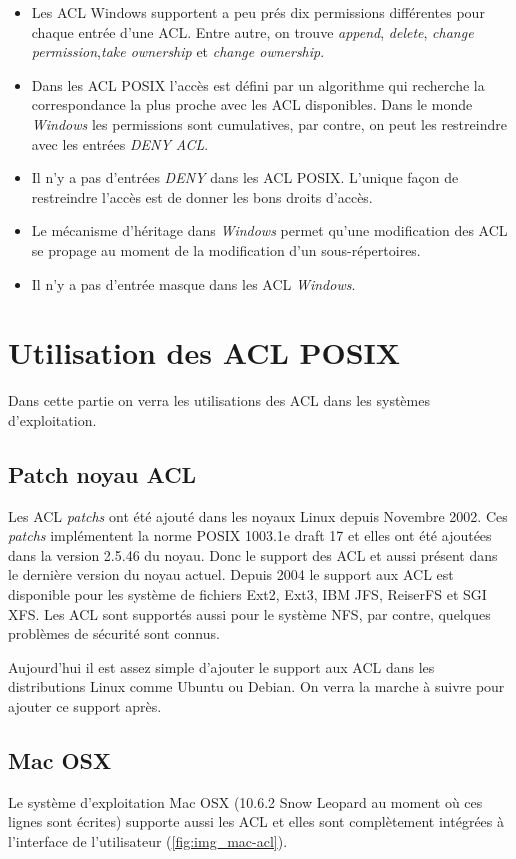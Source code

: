 \documentclass{article}
\begin{document}
\begin{itemize}
	\item Les ACL Windows supportent a peu prés dix permissions différentes pour chaque entrée d'une ACL. Entre autre, on trouve \emph{append}, \emph{delete}, \emph{change permission},\emph{take ownership} et \emph{change ownership}.
	\item Dans les ACL POSIX l'accès est défini par un algorithme qui recherche la correspondance la plus proche avec les ACL disponibles. Dans le monde \emph{Windows} les permissions sont cumulatives, par contre, on peut les restreindre avec les entrées \emph{DENY ACL}.
	\item Il n'y a pas d'entrées \emph{DENY} dans les ACL POSIX. L'unique façon de restreindre l'accès est de donner les bons droits d'accès.
	\item Le mécanisme d'héritage dans \emph{Windows} permet qu'une modification des ACL se propage au moment de la modification d'un sous-répertoires.
	\item Il n'y a pas d'entrée masque dans les ACL \emph{Windows}.
\end{itemize}

\section{Utilisation des ACL POSIX}

Dans cette partie on verra les utilisations des ACL dans les systèmes d'exploitation. 

\subsection{Patch noyau ACL}
Les ACL \emph{patchs} ont été ajouté dans les noyaux Linux depuis Novembre 2002. Ces \emph{patchs} implémentent la norme POSIX 1003.1e draft 17 et elles ont été ajoutées dans la version 2.5.46 du noyau. Donc le support des ACL et aussi présent dans le dernière version du noyau actuel. Depuis 2004 le support aux ACL est disponible pour les système de fichiers Ext2, Ext3, IBM JFS, ReiserFS et SGI XFS. Les ACL sont supportés aussi pour le système NFS, par contre, quelques problèmes de sécurité sont connus\cite{nfs_problem}. 

Aujourd'hui il est assez simple d'ajouter le support aux ACL dans les distributions Linux comme Ubuntu ou Debian. On verra la marche à suivre pour ajouter ce support après.

\subsection{Mac OSX}
Le système d'exploitation Mac OSX (10.6.2 Snow Leopard au moment où ces lignes sont écrites) supporte aussi les ACL et elles sont complètement intégrées à l'interface de l'utilisateur (\ref{fig:img_mac-acl}). 
\end{document}

